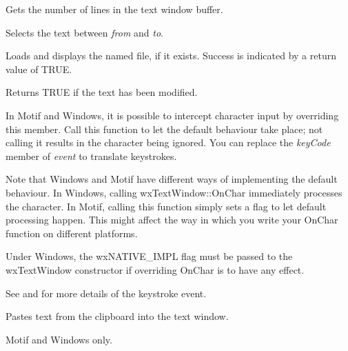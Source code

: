 

Gets the number of lines in the text window buffer.



Selects the text between {\it from} and {\it to}.



Loads and displays the named file, if it exists. Success is indicated by a return
value of TRUE.



Returns TRUE if the text has been modified.



In Motif and Windows, it is possible to intercept character
input by overriding this member. Call this function
to let the default behaviour take place; not calling
it results in the character being ignored. You can
replace the {\it keyCode} member of {\it event} to
translate keystrokes.

Note that Windows and Motif have different ways
of implementing the default behaviour. In Windows,
calling wxTextWindow::OnChar immediately
processes the character. In Motif,
calling this function simply sets a flag
to let default processing happen. This might affect
the way in which you write your OnChar function
on different platforms.

Under Windows, the wxNATIVE\_IMPL flag must
be passed to the wxTextWindow constructor
if overriding OnChar is to have any effect.

See  and\rtfsp
{} for more details
of the keystroke event.



Pastes text from the clipboard into the text window.

Motif and Windows only.

